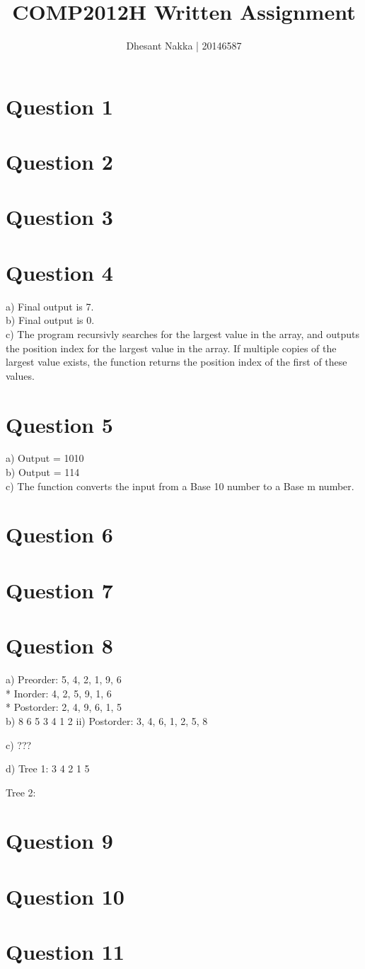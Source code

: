 \documentclass[11pt]{article}
\title{COMP2012H Written Assignment}
\author{Dhesant Nakka | 20146587}
\begin{document}
\maketitle

\section*{Question 1}

\section*{Question 2}

\section*{Question 3}

\section*{Question 4}
a) Final output is 7.\\
b) Final output is 0.\\
c) The program recursivly searches for the largest value in the array, and outputs the position index for the largest value in the array. If multiple copies of the largest value exists, the function returns the position index of the first of these values.

\section*{Question 5}
a) Output = 1010\\
b) Output = 114\\
c) The function converts the input from a Base 10 number to a Base m number.

\section*{Question 6}

\section*{Question 7}

\section*{Question 8}
a) Preorder: 5, 4, 2, 1, 9, 6\\*
   Inorder: 4, 2, 5, 9, 1, 6\\*
   Postorder: 2, 4, 9, 6, 1, 5\\

b) 8
 6   5
3 4 1 2
   ii) Postorder: 3, 4, 6, 1, 2, 5, 8

c) ???

d) Tree 1:
3
4
2
1
5

   Tree 2:
\section*{Question 9}

\section*{Question 10}

\section*{Question 11}
\end{document}
